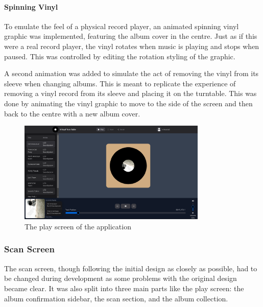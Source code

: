 \paragraph{Spinning Vinyl}
To emulate the feel of a physical record player, an animated spinning vinyl graphic was implemented, featuring the album cover in the centre. Just as if this were a real record player, the vinyl rotates when music is playing and stops when paused. This was controlled by editing the rotation styling of the graphic.

A second animation was added to simulate the act of removing the vinyl from its sleeve when changing albums. This is meant to replicate the experience of removing a vinyl record from its sleeve and placing it on the turntable. This was done by animating the vinyl graphic to move to the side of the screen and then back to the centre with a new album cover.

\begin{figure} [H]
    \centering
    \includegraphics[width=0.8\textwidth]{figures/play_screen.png}
    \caption{The play screen of the application}
    \label{fig:play_screen}
\end{figure}

\subsubsection{Scan Screen}
The scan screen, though following the initial design as closely as possible, had to be changed during development as some problems with the original design became clear. It was also split into three main parts like the play screen: the album confirmation sidebar, the scan section, and the album collection.

